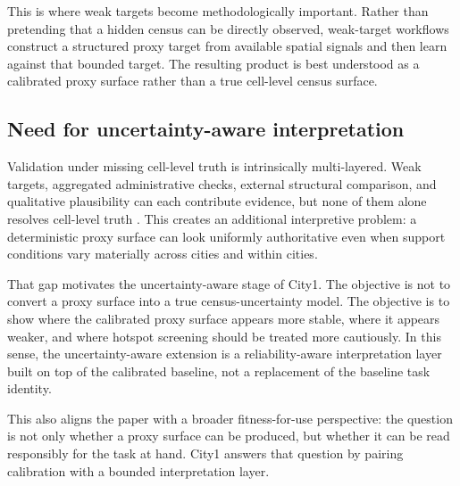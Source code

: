This is where weak targets become methodologically important. Rather than pretending that a hidden census can be directly observed, weak-target workflows construct a structured proxy target from available spatial signals and then learn against that bounded target. The resulting product is best understood as a calibrated proxy surface rather than a true cell-level census surface.

\subsection{Need for uncertainty-aware interpretation}

Validation under missing cell-level truth is intrinsically multi-layered. Weak targets, aggregated administrative checks, external structural comparison, and qualitative plausibility can each contribute evidence, but none of them alone resolves cell-level truth \cite{Leyk2019,Thomson2021,Yin2021}. This creates an additional interpretive problem: a deterministic proxy surface can look uniformly authoritative even when support conditions vary materially across cities and within cities.

That gap motivates the uncertainty-aware stage of City1. The objective is not to convert a proxy surface into a true census-uncertainty model. The objective is to show where the calibrated proxy surface appears more stable, where it appears weaker, and where hotspot screening should be treated more cautiously. In this sense, the uncertainty-aware extension is a reliability-aware interpretation layer built on top of the calibrated baseline, not a replacement of the baseline task identity.

This also aligns the paper with a broader fitness-for-use perspective: the question is not only whether a proxy surface can be produced, but whether it can be read responsibly for the task at hand. City1 answers that question by pairing calibration with a bounded interpretation layer.
